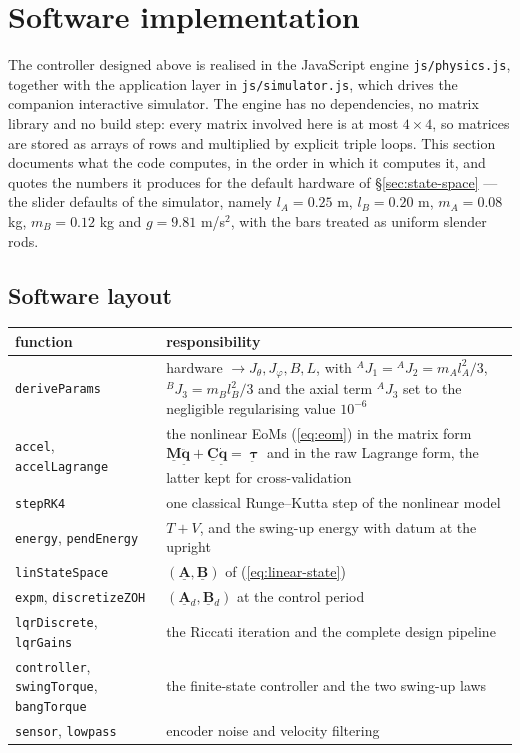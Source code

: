 \documentclass[12pt]{article}
\newcommand{\vb}[1]{{\underset{\tilde{}}{\mathbf{#1}}}}
\newcommand{\mb}[1]{\underline{\mathbf{#1}}}
\begin{document}
\newpage

\section{Software implementation}
\label{sec:impl}

The controller designed above is realised in the JavaScript engine \texttt{js/physics.js}, together with the application layer in \texttt{js/simulator.js}, which drives the companion interactive simulator. The engine has no dependencies, no matrix library and no build step: every matrix involved here is at most $4 \times 4$, so matrices are stored as arrays of rows and multiplied by explicit triple loops. This section documents what the code computes, in the order in which it computes it, and quotes the numbers it produces for the default hardware of \S\ref{sec:state-space} --- the slider defaults of the simulator, namely $l_A = 0.25$ m, $l_B = 0.20$ m, $m_A = 0.08$ kg, $m_B = 0.12$ kg and $g = 9.81$ m/s$^2$, with the bars treated as uniform slender rods.

\subsection{Software layout}
\label{sec:layout}

\begin{center}
\small
\begin{tabular}{l p{8.2cm}}
\hline
function & responsibility \\
\hline
\texttt{deriveParams} & hardware $\rightarrow J_\theta, J_\varphi, B, L$, with ${}^A J_1 = {}^A J_2 = m_A l_A^2/3$, ${}^B J_3 = m_B l_B^2/3$ and the axial term ${}^A J_3$ set to the negligible regularising value $10^{-6}$ \\
\texttt{accel}, \texttt{accelLagrange} & the nonlinear EoMs (\ref{eq:eom}) in the matrix form $\mb{M}\ddot{\vb{q}} + \mb{C}\dot{\vb{q}} = \vb{\uptau}$ and in the raw Lagrange form, the latter kept for cross-validation \\
\texttt{stepRK4} & one classical Runge--Kutta step of the nonlinear model \\
\texttt{energy}, \texttt{pendEnergy} & $T + V$, and the swing-up energy with datum at the upright \\
\texttt{linStateSpace} & $(\mb{A}, \mb{B})$ of (\ref{eq:linear-state}) \\
\texttt{expm}, \texttt{discretizeZOH} & $(\mb{A}{}_d, \mb{B}{}_d)$ at the control period \\
\texttt{lqrDiscrete}, \texttt{lqrGains} & the Riccati iteration and the complete design pipeline \\
\texttt{controller}, \texttt{swingTorque}, \texttt{bangTorque} & the finite-state controller and the two swing-up laws \\
\texttt{sensor}, \texttt{lowpass} & encoder noise and velocity filtering \\
\hline
\end{tabular}
\end{center}
\end{document}
